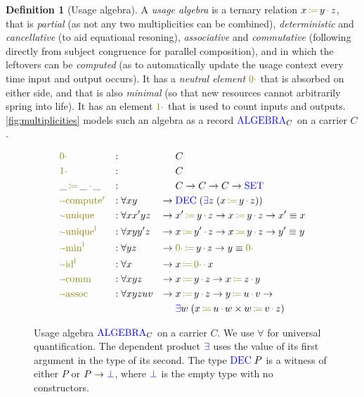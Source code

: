 \documentclass[sigplan,10pt,anonymous,review]{acmart}
\theoremstyle{definition}
\newtheorem{nidefinition}{Definition}
\newcommand{\type}[1]{\textcolor{blue}{\operatorname{#1}}}
\newcommand{\func}[1]{\textcolor{olive}{\operatorname{#1}}}
\newcommand{\op}[3]{#1 \, \func{\coloneqq} \, #2 \, \func{\cdot} \, #3}
\newcommand{\zero}{\func{0\cdot}}
\newcommand{\one}{\func{1\cdot}}
\newcommand{\Set}{\type{SET}}
\newcommand{\Algebra}{\type{ALGEBRA}}
\begin{document}
\begin{nidefinition}[Usage algebra]
  A \emph{usage algebra} is a ternary relation $\op{x}{y}{z}$, that is \emph{partial} (as not any two multiplicities can be combined), \emph{deterministic} and \emph{cancellative} (to aid equational resoning), \emph{associative} and \emph{commutative} (following directly from subject congruence for parallel composition), and in which the leftovers can be \emph{computed} (as to automatically update the usage context every time input and output occurs).
  It has a \emph{neutral element} $\zero$ that is absorbed on either side, and that is also \emph{minimal} (so that new resources cannot arbitrarily spring into life).
  It has an element $\one$ that is used to count inputs and outputs.
  \autoref{fig:multiplicities} models such an algebra as a record $\Algebra_C$ on a carrier $C$.

  \begin{figure}[h]
  \begin{equation*}
  \begin{aligned}
    &\zero                   &:{} &                 &        & C \\
    &\one                    &:{} &                 &        & C \\
    &\op{\_}{\_}{\_}         &:{} &                 &        & C \to C \to C \to \Set \\
    &\func{\cdot-compute^r}  &:{} &\forall x y       & \to \; & \type{DEC} \; (\type{\exists} z  \; (\op{x}{y}{z})) \\
    &\func{\cdot-unique}     &:{} &\forall x x' y z  & \to \; & \op{x'}{y}{z} \to \op{x}{y}{z} \to x' \equiv x \\
    &\func{\cdot-unique^l}   &:{} &\forall x y y' z  & \to \; & \op{x}{y'}{z} \to \op{x}{y}{z} \to y' \equiv y \\
    &\func{\cdot-min^l}      &:{} &\forall y z        & \to \; & \op{\zero}{y}{z} \to y \equiv \zero \\
    &\func{\cdot-id^l}       &:{} &\forall x         & \to \; & \op{x}{\zero}{x} \\
    &\func{\cdot-comm}       &:{} &\forall x y z     & \to \; & \op{x}{y}{z} \to \op{x}{z}{y} \\
    &\func{\cdot-assoc}      &:{} &\forall x y z u v & \to \; & \op{x}{y}{z} \to \op{y}{u}{v} \to \\
    &                        &    &                  &        & \type{\exists} w  \; (\op{x}{u}{w} \times \op{w}{v}{z})
  \end{aligned}
  \end{equation*}
  \caption{
    Usage algebra $\Algebra_C$ on a carrier $C$.
    We use $\forall$ for universal quantification.
    The dependent product $\type{\exists}$ uses the value of its first argument in the type of its second.
    The type $\type{DEC} \; P$ is a witness of either $P$ or $P \to \type{\bot}$, where $\type{\bot}$ is the empty type with no constructors.
  }
  \label{fig:multiplicities}
  \end{figure}
\end{nidefinition}
\end{document}
